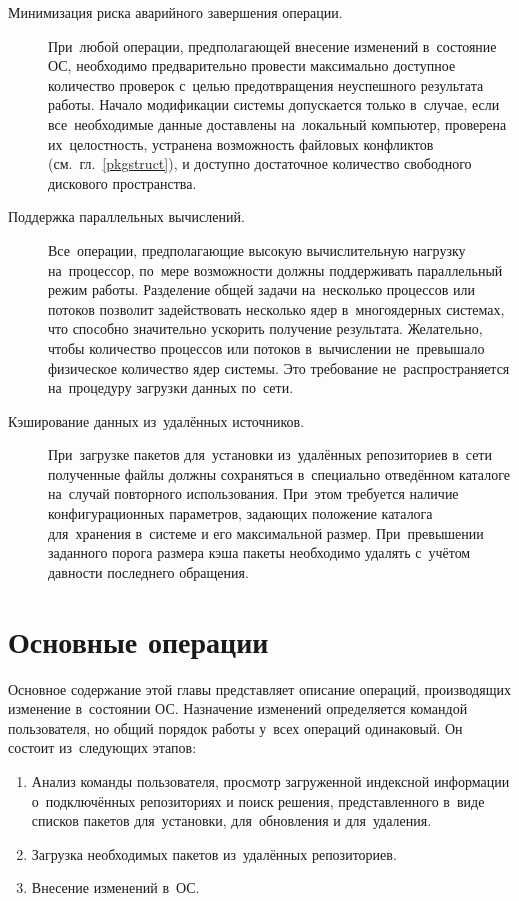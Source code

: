 \begin{description}
\item[Минимизация риска аварийного завершения операции.]
При~любой операции, предполагающей внесение изменений в~состояние ОС, необходимо предварительно 
провести максимально доступное количество проверок с~целью предотвращения неуспешного результата работы.
Начало модификации системы допускается только в~случае, если все~необходимые данные доставлены на~локальный компьютер,
проверена их~целостность, устранена возможность файловых конфликтов (см.~гл.~\ref{pkgstruct}), и доступно достаточное количество свободного дискового пространства.

\item[Поддержка параллельных вычислений.]
Все~операции, предполагающие высокую вычислительную нагрузку на~процессор,
по~мере возможности должны поддерживать параллельный режим работы.
Разделение общей задачи на~несколько процессов или потоков позволит задействовать несколько ядер в~многоядерных системах,
что способно значительно ускорить получение результата. 
Желательно, чтобы количество процессов или потоков в~вычислении не~превышало физическое количество ядер системы.
Это требование не~распространяется на~процедуру загрузки данных по~сети.

\item[Кэширование данных из~удалённых источников.]
При~загрузке пакетов для~установки из~удалённых репозиториев в~сети
полученные файлы должны сохраняться в~специально отведённом каталоге на~случай повторного использования.
При~этом требуется наличие конфигурационных параметров, задающих положение каталога для~хранения в~системе и его максимальной размер.
При~превышении заданного порога размера кэша пакеты необходимо удалять с~учётом давности последнего обращения.

\end{description}

\section{Основные операции}

Основное содержание этой главы представляет описание операций, производящих изменение в~состоянии ОС.
Назначение  изменений определяется командой пользователя, но общий порядок работы у~всех операций одинаковый.
Он состоит из~следующих этапов:

\begin{enumerate}

\item{
Анализ команды пользователя, просмотр загруженной индексной информации о~подключённых репозиториях
и поиск решения, представленного в~виде списков пакетов для~установки, для~обновления и для~удаления.
}

\item {Загрузка необходимых пакетов из~удалённых репозиториев.}
\item {Внесение изменений в~ОС.}

\end{enumerate}

